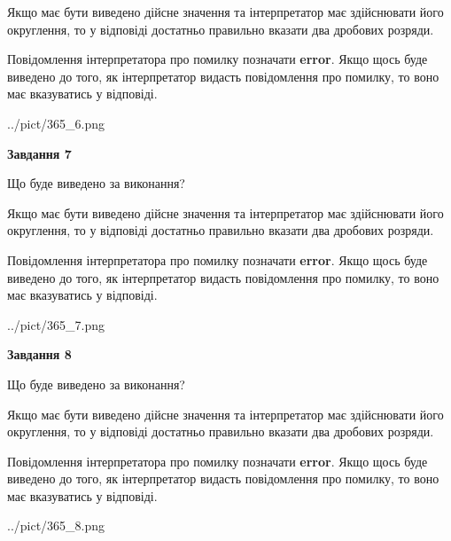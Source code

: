 \documentclass[12pt, ukrainian]{article}
\begin{document}
{\begin {Large}
Якщо має бути виведено дійсне значення та інтерпретатор має здійснювати його округлення, 
то у відповіді достатньо правильно вказати два дробових розряди.

Повідомлення інтерпретатора про помилку позначати \textbf{error}.
Якщо щось буде виведено до того, як інтерпретатор видасть повідомлення про помилку, 
то воно має вказуватись у відповіді. \par

\begin{center}
	{../pict/365_6.png}
\end{center}
\newpage

{\begin {center}\textbf{Завдання 7}\end {center}}\par
Що буде виведено за виконання? \par

Якщо має бути виведено дійсне значення та інтерпретатор має здійснювати його округлення, 
то у відповіді достатньо правильно вказати два дробових розряди.

Повідомлення інтерпретатора про помилку позначати \textbf{error}.
Якщо щось буде виведено до того, як інтерпретатор видасть повідомлення про помилку, 
то воно має вказуватись у відповіді. \par

\begin{center}
	{../pict/365_7.png}
\end{center}
\newpage

{\begin {center}\textbf{Завдання 8}\end {center}}\par
Що буде виведено за виконання? \par

Якщо має бути виведено дійсне значення та інтерпретатор має здійснювати його округлення, 
то у відповіді достатньо правильно вказати два дробових розряди.

Повідомлення інтерпретатора про помилку позначати \textbf{error}.
Якщо щось буде виведено до того, як інтерпретатор видасть повідомлення про помилку, 
то воно має вказуватись у відповіді. \par

\begin{center}
	{../pict/365_8.png}
\end{center}
\newpage


\end{Large}}
\end{document}
